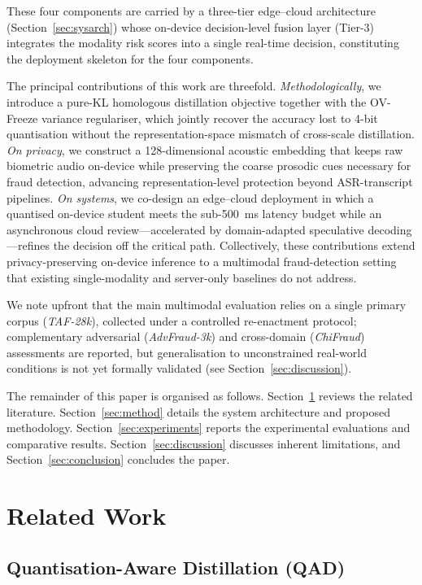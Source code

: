\documentclass[a4paper,fleqn]{cas-sc}
\begin{document}
These four components are carried by a three-tier edge--cloud architecture (Section~\ref{sec:sysarch}) whose on-device decision-level fusion layer (Tier-3) integrates the modality risk scores into a single real-time decision, constituting the deployment skeleton for the four components.

The principal contributions of this work are threefold. \textit{Methodologically}, we introduce a pure-KL homologous distillation objective together with the OV-Freeze variance regulariser, which jointly recover the accuracy lost to 4-bit quantisation without the representation-space mismatch of cross-scale distillation. \textit{On privacy}, we construct a 128-dimensional acoustic embedding that keeps raw biometric audio on-device while preserving the coarse prosodic cues necessary for fraud detection, advancing representation-level protection beyond ASR-transcript pipelines. \textit{On systems}, we co-design an edge--cloud deployment in which a quantised on-device student meets the sub-500~ms latency budget while an asynchronous cloud review---accelerated by domain-adapted speculative decoding---refines the decision off the critical path. Collectively, these contributions extend privacy-preserving on-device inference to a multimodal fraud-detection setting that existing single-modality and server-only baselines do not address.

\vspace{0.5em}
We note upfront that the main multimodal evaluation relies on a single primary corpus (\textit{TAF-28k}), collected under a controlled re-enactment protocol; complementary adversarial (\textit{AdvFraud-3k}) and cross-domain (\textit{ChiFraud}) assessments are reported, but generalisation to unconstrained real-world conditions is not yet formally validated (see Section~\ref{sec:discussion}).

The remainder of this paper is organised as follows. Section~\ref{sec:related} reviews the related literature. Section~\ref{sec:method} details the system architecture and proposed methodology. Section~\ref{sec:experiments} reports the experimental evaluations and comparative results. Section~\ref{sec:discussion} discusses inherent limitations, and Section~\ref{sec:conclusion} concludes the paper.

\section{Related Work}\label{sec:related}
\subsection{Quantisation-Aware Distillation (QAD)}
\end{document}
